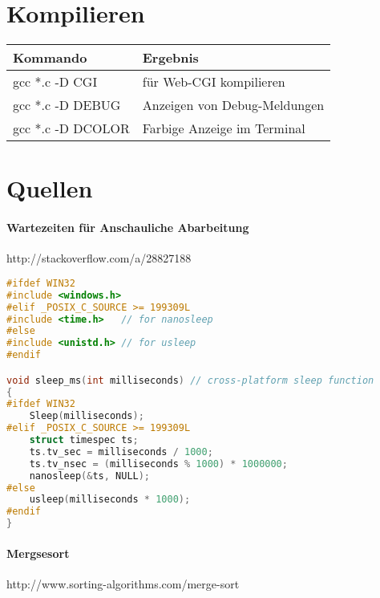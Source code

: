 \section{Kompilieren}

\begin{tabular}{l l}
Kommando & Ergebnis\\
\hline
gcc *.c -D CGI & für Web-CGI kompilieren\\
gcc *.c -D DEBUG & Anzeigen von Debug-Meldungen\\
gcc *.c -D DCOLOR & Farbige Anzeige im Terminal\\
\end{tabular}

\section{Quellen}
\paragraph{Wartezeiten für Anschauliche Abarbeitung}
http://stackoverflow.com/a/28827188
\begin{lstlisting}[language=C]
#ifdef WIN32
#include <windows.h>
#elif _POSIX_C_SOURCE >= 199309L
#include <time.h>   // for nanosleep
#else
#include <unistd.h> // for usleep
#endif

void sleep_ms(int milliseconds) // cross-platform sleep function
{
#ifdef WIN32
    Sleep(milliseconds);
#elif _POSIX_C_SOURCE >= 199309L
    struct timespec ts;
    ts.tv_sec = milliseconds / 1000;
    ts.tv_nsec = (milliseconds % 1000) * 1000000;
    nanosleep(&ts, NULL);
#else
    usleep(milliseconds * 1000);
#endif
}
\end{lstlisting}
\paragraph{Mergsesort}
http://www.sorting-algorithms.com/merge-sort
